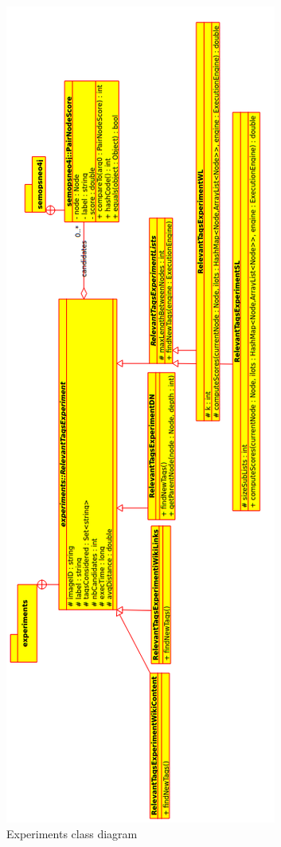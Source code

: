 \begin{figure}[h]
\begin{center}
\includegraphics[scale=0.6]{./Primitives/experimentsModel.png}
\end{center}
\caption{Experiments class diagram}
\label{fig:exp_model}
\end{figure}
